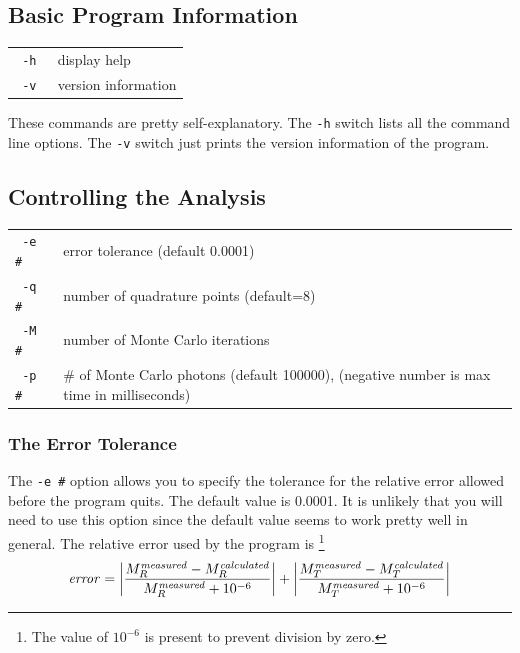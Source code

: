 \documentclass{article}
\begin{document}
\subsection{Basic Program Information}

\begin{center}
\begin{tabular}{lp{7cm}}
\texttt{ -h                  }& display help              \\
\texttt{ -v                  }& version information                        \\
\end{tabular}
\end{center}

These commands are pretty self-explanatory.  The \texttt{-h} switch lists all the
command line options.  The \texttt{-v} switch just prints the version information
of the program.

\subsection{Controlling the Analysis}

\begin{center}
\begin{tabular}{lp{7cm}}
\texttt{ -e \#               }& error tolerance (default 0.0001)           \\
\texttt{ -q \#               }& number of quadrature points (default=8)    \\
\texttt{ -M \#               }& number of Monte Carlo iterations           \\
\texttt{ -p \#               }& \# of Monte Carlo photons (default 100000),
                              (negative number is max time in milliseconds)\\[3mm]
\end{tabular}
\end{center}

\subsubsection{The Error Tolerance }
\label{error}
The \texttt{-e \#} option allows you to specify the tolerance for the relative error allowed
before the program quits.  The default value is 0.0001. It is unlikely that you will need to
use this option since the default value seems to work pretty well in general.
The relative error used by the program is%
\footnote{The value of $10^{-6}$ is present to prevent division by zero.} 
$$
\mathit{error} = \left| {M_R^\mathit{measured}-M_R^\mathit{calculated} \over M_R^\mathit{measured} + 10^{-6}} \right|
               + \left| {M_T^\mathit{measured}-M_T^\mathit{calculated} \over M_T^\mathit{measured} + 10^{-6}} \right|
$$
\end{document}
